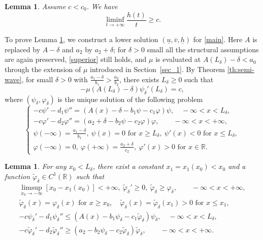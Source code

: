 \documentclass[reqno]{amsart}
\newcommand{\rev}[1]{#1}
\theoremstyle{plain}
\newtheorem{lemma}[theorem]{Lemma}
\theoremstyle{definition}
\theoremstyle{remark}
\begin{document}
	\begin{lemma}\label{lem:liminf} Assume $c < c_0$. We have
		\[
		\liminf_{t \to +\infty} \frac{h(t)}{t} \ge c.
		\]
	\end{lemma}	
	
	To prove Lemma \ref{lem:liminf}, we construct a lower solution $(\underline{u}, \overline{v}, \underline{h})$ for \eqref{main}. \rev{Here $A$ is replaced by $A-\delta$ and $a_2$ by $a_2+\delta$; for $\delta>0$ small all the structural assumptions are again preserved, \eqref{superior} still holds, and $\mu$ is evaluated at $A(L_\delta)-\delta<a_0$ through the extension of $\mu$ introduced in Section~\ref{sec_1}.} By Theorem \ref{th:semi-wave}, for small $\delta>0$ with $\frac{a_1 - \delta}{b_1}>\frac{a_2}{b_2}$, there exists \(L_\delta \ge 0\) such that 
	\[
	-\mu(A(L_\delta)-\delta)\psi_\delta'(L_\delta) = c,
	\]
	where \((\psi_\delta, \varphi_\delta)\) is the unique solution of the following problem	
	\begin{equation}\label{aux}
		\begin{cases}
			-c \psi' - d_1 \psi'' = (A(x) - \delta - b_1\psi - c_1\varphi)\psi, \quad-\infty < x < L_\delta,\\
			-c \varphi' - d_2 \varphi'' = (a_2 + \delta - b_2\psi - c_2\varphi)\varphi, \qquad -\infty < x < +\infty,\\
			\psi(-\infty) = \frac{a_1 - \delta}{b_1}, ~ \psi(x)=0 \text{ for } x\ge L_\delta, ~ \psi'(x)<0 \text{ for } x\le L_\delta,\\	
			\varphi(-\infty) = 0, ~ \varphi(+\infty)=\frac{a_2 + \delta}{c_2}, ~ \varphi'(x)>0 \text{ for } x\in \mathbb{R}.
		\end{cases}
	\end{equation}
	
	\begin{lemma}\label{lm:aux}
		For any \(x_0 < L_\delta\), there exist a constant \(x_1 = x_1(x_0) < x_0\) and a function \(\tilde{\varphi}_{\delta} \in C^1(\mathbb{R})\) such that
		\begin{align*}
			\limsup_{x_0 \to -\infty}[x_0-x_1(x_0) ] < +\infty, ~ \tilde{\varphi}_\delta' \ge 0, ~ \tilde{\varphi}_\delta \ge \varphi_\delta, \qquad -\infty < x < +\infty,\\
			\tilde{\varphi}_\delta(x) = \varphi_\delta(x) \text{ for } x\ge x_0,\quad \tilde{\varphi}_\delta(x) = \tilde{\varphi}_\delta(x_1) > 0 \text{ for } x \le x_1,\\
			-c \psi_\delta' -d_1 \psi_\delta'' \le (A(x) - b_1 \psi_\delta - c_1 \tilde{\varphi}_\delta) \psi_\delta, \quad-\infty < x < L_\delta,\\
			-c\tilde{\varphi}_\delta' - d_2 \tilde{\varphi}_\delta'' \ge (a_2 - b_2\psi_\delta - c_2\tilde{\varphi}_\delta) \tilde{\varphi}_\delta, \qquad -\infty < x < +\infty.
		\end{align*}
	\end{lemma}
	
\end{document}
